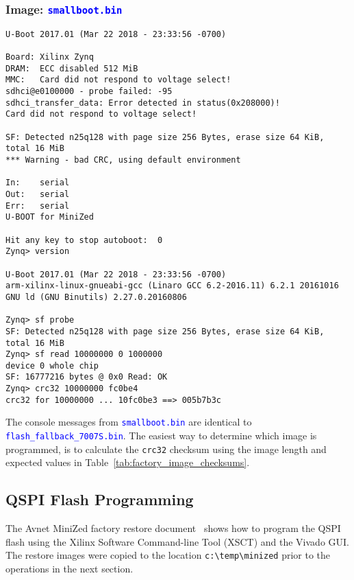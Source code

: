 \subsubsection*{Image: \textcolor{blue}{\texttt{smallboot.bin}}}
%
\begin{verbatim}
U-Boot 2017.01 (Mar 22 2018 - 23:33:56 -0700)

Board: Xilinx Zynq
DRAM:  ECC disabled 512 MiB
MMC:   Card did not respond to voltage select!
sdhci@e0100000 - probe failed: -95
sdhci_transfer_data: Error detected in status(0x208000)!
Card did not respond to voltage select!

SF: Detected n25q128 with page size 256 Bytes, erase size 64 KiB, total 16 MiB
*** Warning - bad CRC, using default environment

In:    serial
Out:   serial
Err:   serial
U-BOOT for MiniZed

Hit any key to stop autoboot:  0
Zynq> version

U-Boot 2017.01 (Mar 22 2018 - 23:33:56 -0700)
arm-xilinx-linux-gnueabi-gcc (Linaro GCC 6.2-2016.11) 6.2.1 20161016
GNU ld (GNU Binutils) 2.27.0.20160806

Zynq> sf probe
SF: Detected n25q128 with page size 256 Bytes, erase size 64 KiB, total 16 MiB
Zynq> sf read 10000000 0 1000000
device 0 whole chip
SF: 16777216 bytes @ 0x0 Read: OK
Zynq> crc32 10000000 fc0be4
crc32 for 10000000 ... 10fc0be3 ==> 005b7b3c
\end{verbatim}
%
The console messages from \textcolor{blue}{\texttt{smallboot.bin}} are
identical to \textcolor{blue}{\texttt{flash\_fallback\_7007S.bin}}. The
easiest way to determine which image is programmed, is
to calculate the \verb+crc32+ checksum using the image length and
expected values in Table~\ref{tab:factory_image_checksums}.

\clearpage
\subsection{QSPI Flash Programming}
\label{sec:qspi_flash_programming}

The Avnet MiniZed factory restore document~\cite{Avnet_MiniZed_Restore_2018}
shows how to program the QSPI flash using the Xilinx Software Command-line
Tool (XSCT) and the Vivado GUI. The restore images were copied to the
location \verb+c:\temp\minized+ prior to the operations in the next section.

